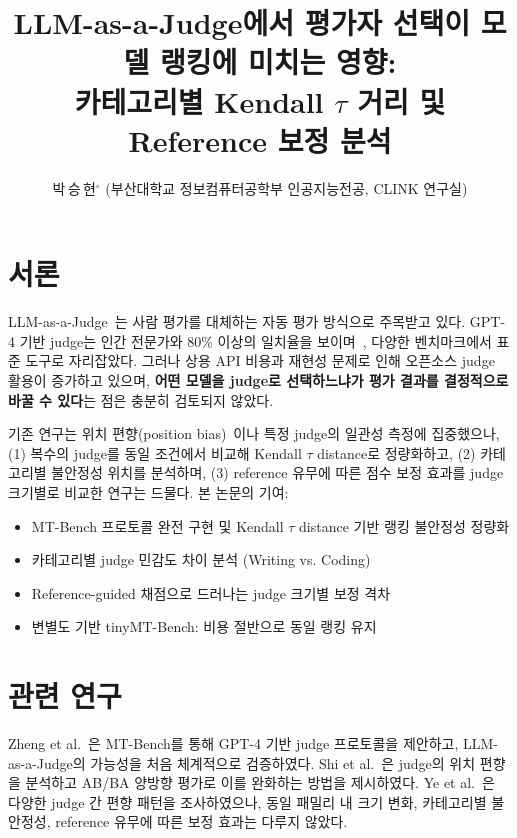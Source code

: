 \documentclass{kcc}
\title{LLM-as-a-Judge에서 평가자 선택이 모델 랭킹에 미치는 영향:\\
카테고리별 Kendall $\tau$ 거리 및 Reference 보정 분석}
\author{박\,승\,현$^\circ$ (부산대학교 정보컴퓨터공학부 인공지능전공, CLINK 연구실)}
\begin{document}
\maketitle

\section{서론}

LLM-as-a-Judge~\cite{zheng2023}는 사람 평가를 대체하는 자동 평가
방식으로 주목받고 있다. GPT-4 기반 judge는 인간 전문가와 80\% 이상의
일치율을 보이며~\cite{zheng2023}, 다양한 벤치마크에서 표준 도구로 자리잡았다.
그러나 상용 API 비용과 재현성 문제로 인해 오픈소스 judge 활용이 증가하고
있으며, \textbf{어떤 모델을 judge로 선택하느냐가 평가 결과를 결정적으로
바꿀 수 있다}는 점은 충분히 검토되지 않았다.

기존 연구는 위치 편향(position bias)~\cite{shi2024}이나 특정 judge의
일관성 측정에 집중했으나, (1) 복수의 judge를 동일 조건에서 비교해
Kendall $\tau$ distance로 정량화하고, (2) 카테고리별 불안정성 위치를
분석하며, (3) reference 유무에 따른 점수 보정 효과를 judge 크기별로
비교한 연구는 드물다. 본 논문의 기여:
\begin{itemize}
  \item MT-Bench 프로토콜 완전 구현 및 Kendall $\tau$ distance 기반 랭킹 불안정성 정량화
  \item 카테고리별 judge 민감도 차이 분석 (Writing vs. Coding)
  \item Reference-guided 채점으로 드러나는 judge 크기별 보정 격차
  \item 변별도 기반 tinyMT-Bench: 비용 절반으로 동일 랭킹 유지
\end{itemize}

\section{관련 연구}

Zheng et al.~\cite{zheng2023}은 MT-Bench를 통해 GPT-4 기반 judge 프로토콜을
제안하고, LLM-as-a-Judge의 가능성을 처음 체계적으로 검증하였다.
Shi et al.~\cite{shi2024}은 judge의 위치 편향을 분석하고 AB/BA 양방향 평가로
이를 완화하는 방법을 제시하였다. Ye et al.~\cite{ye2024}은 다양한 judge 간
편향 패턴을 조사하였으나, 동일 패밀리 내 크기 변화, 카테고리별 불안정성,
reference 유무에 따른 보정 효과는 다루지 않았다.
\end{document}
